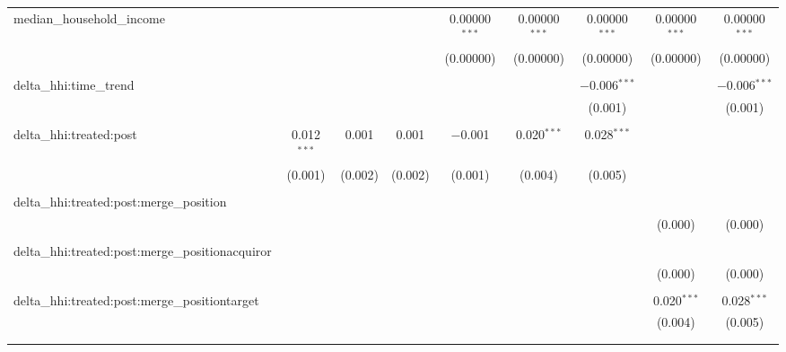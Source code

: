 \begin{table}[H]
{\begin{tabular}{@{\extracolsep{5pt}}lcccccccc}
  median\_household\_income &  &  &  & 0.00000$^{***}$ & 0.00000$^{***}$ & 0.00000$^{***}$ & 0.00000$^{***}$ & 0.00000$^{***}$ \\  

   &  &  &  & (0.00000) & (0.00000) & (0.00000) & (0.00000) & (0.00000) \\  

   & & & & & & & & \\  

  delta\_hhi:time\_trend &  &  &  &  &  & $-$0.006$^{***}$ &  & $-$0.006$^{***}$ \\  

   &  &  &  &  &  & (0.001) &  & (0.001) \\  

   & & & & & & & & \\  

  delta\_hhi:treated:post & 0.012$^{***}$ & 0.001 & 0.001 & $-$0.001 & 0.020$^{***}$ & 0.028$^{***}$ &  &  \\  

   & (0.001) & (0.002) & (0.002) & (0.001) & (0.004) & (0.005) &  &  \\  

   & & & & & & & & \\  

  delta\_hhi:treated:post:merge\_position &  &  &  &  &  &  &  &  \\  

   &  &  &  &  &  &  & (0.000) & (0.000) \\  

   & & & & & & & & \\  

  delta\_hhi:treated:post:merge\_positionacquiror &  &  &  &  &  &  &  &  \\  

   &  &  &  &  &  &  & (0.000) & (0.000) \\  

   & & & & & & & & \\  

  delta\_hhi:treated:post:merge\_positiontarget &  &  &  &  &  &  & 0.020$^{***}$ & 0.028$^{***}$ \\  

   &  &  &  &  &  &  & (0.004) & (0.005) \\  

   & & & & & & & & \\  

 \hline \\[-1.8ex]  


\end{tabular}}
\end{table}
